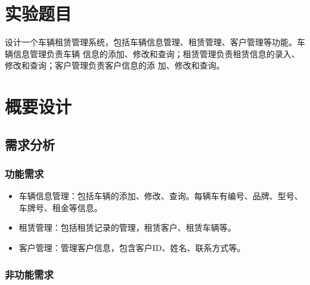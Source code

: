 \documentclass[UTF8,a4paper,12pt]{ctexart}
\begin{document}
 
 
 


\newpage 
\tableofcontents
\newpage
\section{实验题目}
设计一个车辆租赁管理系统，包括车辆信息管理、租赁管理、客户管理等功能。车辆信息管理负责车辆
信息的添加、修改和查询；租赁管理负责租赁信息的录入、修改和查询；客户管理负责客户信息的添
加、修改和查询。
\section{概要设计}
\subsection{需求分析}

\subsubsection{功能需求}

\begin{itemize}
    \item 车辆信息管理：包括车辆的添加、修改、查询。每辆车有编号、品牌、型号、车牌号、租金等信息。
    \item 租赁管理：包括租赁记录的管理，租赁客户、租赁车辆等。
    \item 客户管理：管理客户信息，包含客户ID、姓名、联系方式等。
\end{itemize}

\subsubsection{非功能需求}
\end{document}
